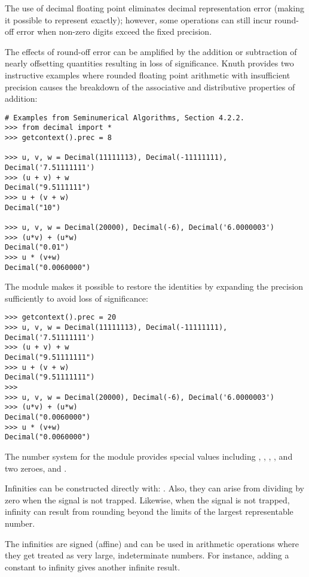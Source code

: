 The use of decimal floating point eliminates decimal representation error
(making it possible to represent  exactly); however, some
operations can still incur round-off error when non-zero digits exceed the
fixed precision.

The effects of round-off error can be amplified by the addition or subtraction
of nearly offsetting quantities resulting in loss of significance.  Knuth
provides two instructive examples where rounded floating point arithmetic with
insufficient precision causes the breakdown of the associative and
distributive properties of addition:

\begin{verbatim}
# Examples from Seminumerical Algorithms, Section 4.2.2.
>>> from decimal import *
>>> getcontext().prec = 8

>>> u, v, w = Decimal(11111113), Decimal(-11111111), Decimal('7.51111111')
>>> (u + v) + w
Decimal("9.5111111")
>>> u + (v + w)
Decimal("10")

>>> u, v, w = Decimal(20000), Decimal(-6), Decimal('6.0000003')
>>> (u*v) + (u*w)
Decimal("0.01")
>>> u * (v+w)
Decimal("0.0060000")
\end{verbatim}

The  module makes it possible to restore the identities
by expanding the precision sufficiently to avoid loss of significance:

\begin{verbatim}
>>> getcontext().prec = 20
>>> u, v, w = Decimal(11111113), Decimal(-11111111), Decimal('7.51111111')
>>> (u + v) + w
Decimal("9.51111111")
>>> u + (v + w)
Decimal("9.51111111")
>>> 
>>> u, v, w = Decimal(20000), Decimal(-6), Decimal('6.0000003')
>>> (u*v) + (u*w)
Decimal("0.0060000")
>>> u * (v+w)
Decimal("0.0060000")
\end{verbatim}


The number system for the  module provides special
values including , , ,
, and two zeroes,  and .

Infinities can be constructed directly with:  . Also,
they can arise from dividing by zero when the 
signal is not trapped.  Likewise, when the  signal is not
trapped, infinity can result from rounding beyond the limits of the largest
representable number.

The infinities are signed (affine) and can be used in arithmetic operations
where they get treated as very large, indeterminate numbers.  For instance,
adding a constant to infinity gives another infinite result.

